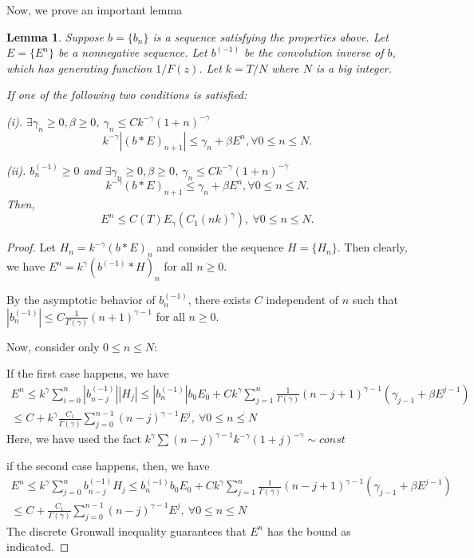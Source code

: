 \documentclass[11pt]{article} %
\newtheorem{lmm}{Lemma}
\begin{document}
Now, we prove an important lemma
\begin{lmm}
Suppose $b=\{b_n\}$ is a sequence satisfying the properties above. Let $E=\{E^n\}$ be a nonnegative sequence. Let $b^{(-1)}$ be the convolution inverse of $b$, which has generating function $1/F(z)$. Let $k=T/N$ where $N$ is a big integer.

If one of the following two conditions is satisfied:

 (i). $\exists \gamma_n\ge 0,\beta\ge 0$, $\gamma_n\le Ck^{-\gamma}(1+n)^{-\gamma}$
 $$
k^{-\gamma}|(b*E)_{n+1}|\le \gamma_n+\beta E^n,\forall 0\le n\le N.
$$

(ii). $b^{(-1)}_n\ge 0$ and $\exists \gamma_n\ge0, \beta\ge0$, $\gamma_n\le Ck^{-\gamma}(1+n)^{-\gamma}$
$$
k^{-\gamma}(b*E)_{n+1}\le \gamma_n+\beta E^n,\forall 0\le n\le N.
$$
Then, $$
E^n\le C(T)E_{\gamma}(C_1(nk)^{\gamma}),\ \forall 0\le n\le N.
$$
\end{lmm}
\begin{proof}
Let $H_n=k^{-\gamma}(b*E)_{n}$ and consider the sequence $H=\{H_n\}$. Then clearly, we have $E^n=k^{\gamma}(b^{(-1)}*H)_n$ for all $n\ge 0$.

By the asymptotic behavior of $b^{(-1)}_n$, there exists $C$ independent of $n$ such that $|b^{(-1)}_n|\le C \frac{1}{\Gamma(\gamma)}(n+1)^{\gamma-1}$ for all $n\ge 0$.

Now, consider only $0\le n\le N$:

If the first case happens, we have 
\begin{gather*}
E^n\le k^{\gamma}\sum_{i=0}^n |b_{n-j}^{(-1)}| |H_{j}|
\le |b_n^{(-1)}|b_0E_0+Ck^{\gamma}\sum_{j=1}^{n} \frac{1}{\Gamma(\gamma)}(n-j+1)^{\gamma-1}
(\gamma_{j-1}+\beta E^{j-1})\\
\le C+k^{\gamma}\frac{C_1}{\Gamma(\gamma)}\sum_{j=0}^{n-1}(n-j)^{\gamma-1}E^j,\ \forall 0\le n\le N
\end{gather*}
Here, we have used the fact $k^{\gamma}\sum (n-j)^{\gamma-1}k^{-\gamma}(1+j)^{-\gamma}\sim const$

if the second case happens, then, we have 
\begin{gather*}
E^n\le k^{\gamma}\sum_{j=0}^n b_{n-j}^{(-1)} H_{j}
\le b_n^{(-1)}b_0E_0+Ck^{\gamma}\sum_{j=1}^{n} \frac{1}{\Gamma(\gamma)}(n-j+1)^{\gamma-1}
(\gamma_{j-1}+\beta E^{j-1})\\
\le C+\frac{C_1}{\Gamma(\gamma)}\sum_{j=0}^{n-1}(n-j)^{\gamma-1}E^j,\ \forall 0\le n\le N
\end{gather*}
The discrete Gronwall inequality guarantees that $E^n$ has the bound as indicated.
\end{proof}
\end{document}
